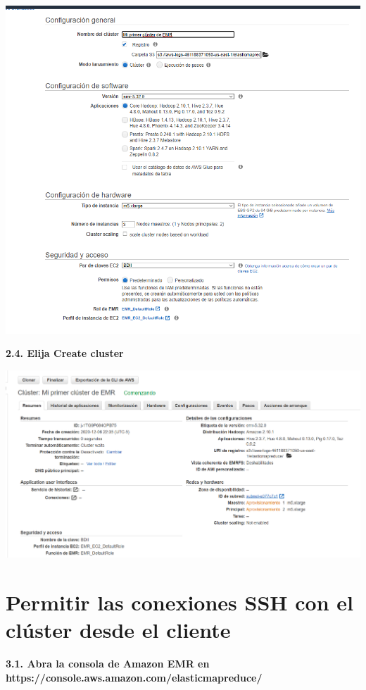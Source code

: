 \documentclass{article}
\begin{document}
    \begin{center}
		\includegraphics[width=15cm]{./images/8} 
	\end{center}

\newpage
\textbf{2.4. Elija Create cluster
}

    \begin{center}
		\includegraphics[width=15cm]{./images/9} 
	\end{center}


\section{Permitir las conexiones SSH con el clúster desde el cliente }

\textbf{3.1. Abra la consola de Amazon EMR en https://console.aws.amazon.com/elasticmapreduce/ }
\end{document}
